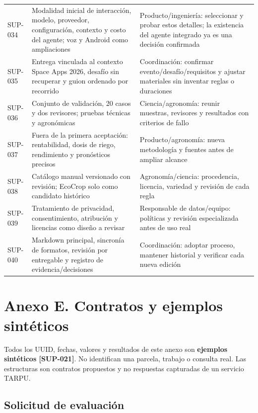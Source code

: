 \documentclass[10pt,a4paper]{article}
\begin{document}
\begin{longtable}{>{\raggedright\arraybackslash}p{2.061cm}>{\raggedright\arraybackslash}p{7.294cm}>{\raggedright\arraybackslash}p{6.501cm}}
SUP-034 & Modalidad inicial de interacción, modelo, proveedor, configuración, contexto y costo del agente; voz y Android como ampliaciones & Producto/\allowbreak{}ingeniería: seleccionar y probar estos detalles; la existencia del agente integrado ya es una decisión confirmada \\[3pt]
SUP-035 & Entrega vinculada al contexto Space Apps 2026, desafío sin recuperar y guion ordenado por recorrido & Coordinación: confirmar evento/\allowbreak{}desafío/\allowbreak{}requisitos y ajustar materiales sin inventar reglas o duraciones \\[3pt]
SUP-036 & Conjunto de validación, 20 casos y dos revisores; pruebas técnicas y agronómicas & Ciencia/\allowbreak{}agronomía: reunir muestras, revisores y resultados con criterios de fallo \\[3pt]
SUP-037 & Fuera de la primera aceptación: rentabilidad, dosis de riego, rendimiento y pronósticos precisos & Producto/\allowbreak{}agronomía: nueva metodología y fuentes antes de ampliar alcance \\[3pt]
SUP-038 & Catálogo manual versionado con revisión; EcoCrop solo como candidato histórico & Agronomía/\allowbreak{}ciencia: procedencia, licencia, variedad y revisión de cada regla \\[3pt]
SUP-039 & Tratamiento de privacidad, consentimiento, atribución y licencias como diseño a revisar & Responsable de datos/\allowbreak{}equipo: políticas y revisión especializada antes de uso real \\[3pt]
SUP-040 & Markdown principal, sincronía de formatos, revisión por entregable y registro de evidencia/\allowbreak{}decisiones & Coordinación: adoptar proceso, mantener historial y verificar cada nueva edición \\[3pt]
\end{longtable}
\endgroup

\clearpage\section{Anexo E. Contratos y ejemplos sintéticos}\label{anexo-e-contratos-y-ejemplos-sintéticos}

Todos los UUID, fechas, valores y resultados de este anexo son \textbf{ejemplos sintéticos [SUP-021]}. No identifican una parcela, trabajo o consulta real. Las estructuras son contratos propuestos y no respuestas capturadas de un servicio TARPU.


\subsection{Solicitud de evaluación}
\end{document}
